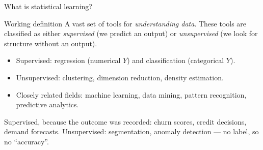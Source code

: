 \documentclass[aspectratio=169,11pt]{beamer}
\begin{document}
\begin{frame}{What is statistical learning?}
  \begin{block}{Working definition}
    A vast set of tools for \emph{understanding data}. These tools are
    classified as either \emph{supervised} (we predict an output) or
    \emph{unsupervised} (we look for structure without an output).
  \end{block}
  \begin{readme}
    \begin{itemize}
      \item Supervised: regression (numerical $Y$) and classification
            (categorical $Y$).
      \item Unsupervised: clustering, dimension reduction, density
            estimation.
      \item Closely related fields: machine learning, data mining,
            pattern recognition, predictive analytics.
    \end{itemize}
  \end{readme}
  \begin{industry}
    Supervised, because the outcome was recorded: churn scores, credit decisions, demand
    forecasts. Unsupervised: segmentation, anomaly detection --- no label, so no ``accuracy''.
  \end{industry}
\end{frame}
\end{document}
